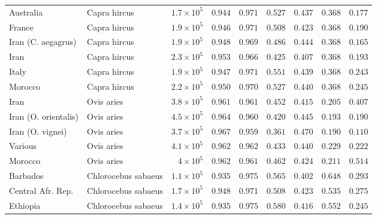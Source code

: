 \documentclass{article}
\begin{document}
\begin{table}[tb]
\begin{adjustbox}{width=\textwidth}
\begin{tabular}{||l|l|r||r|r||r|r||r|r||}
                \rowcolor{LIGHTGREY} Australia & Capra hircus & $1.7\times 10^{5}$ & $ 0.944$ & $ 0.971$ & $ 0.527$ & $ 0.437$ & $ 0.368$ & $ 0.177$ \\
                \rowcolor{LIGHTGREY} France & Capra hircus & $1.9\times 10^{5}$ & $ 0.946$ & $ 0.971$ & $ 0.508$ & $ 0.423$ & $ 0.368$ & $ 0.190$ \\
                \rowcolor{LIGHTGREY} Iran (C. aegagrus) & Capra hircus & $1.9\times 10^{5}$ & $ 0.948$ & $ 0.969$ & $ 0.486$ & $ 0.444$ & $ 0.368$ & $ 0.165$ \\
                \rowcolor{LIGHTGREY} Iran & Capra hircus & $2.3\times 10^{5}$ & $ 0.953$ & $ 0.966$ & $ 0.425$ & $ 0.407$ & $ 0.368$ & $ 0.193$ \\
                \rowcolor{LIGHTGREY} Italy & Capra hircus & $1.9\times 10^{5}$ & $ 0.947$ & $ 0.971$ & $ 0.551$ & $ 0.439$ & $ 0.368$ & $ 0.243$ \\
                \rowcolor{LIGHTGREY} Morocco & Capra hircus & $2.2\times 10^{5}$ & $ 0.950$ & $ 0.970$ & $ 0.527$ & $ 0.440$ & $ 0.368$ & $ 0.245$ \\
                Iran & Ovis aries & $3.8\times 10^{5}$ & $ 0.961$ & $ 0.961$ & $ 0.452$ & $ 0.415$ & $ 0.205$ & $ 0.407$ \\
                Iran (O. orientalis) & Ovis aries & $4.5\times 10^{5}$ & $ 0.964$ & $ 0.960$ & $ 0.420$ & $ 0.445$ & $ 0.193$ & $ 0.190$ \\
                Iran (O. vignei) & Ovis aries & $3.7\times 10^{5}$ & $ 0.967$ & $ 0.959$ & $ 0.361$ & $ 0.470$ & $ 0.190$ & $ 0.110$ \\
                Various & Ovis aries & $4.1\times 10^{5}$ & $ 0.962$ & $ 0.962$ & $ 0.433$ & $ 0.440$ & $ 0.229$ & $ 0.222$ \\
                Morocco & Ovis aries & $ 4\times 10^{5}$ & $ 0.962$ & $ 0.961$ & $ 0.462$ & $ 0.424$ & $ 0.211$ & $ 0.514$ \\
                \rowcolor{LIGHTGREY} Barbados & Chlorocebus sabaeus & $1.1\times 10^{5}$ & $ 0.935$ & $ 0.975$ & $ 0.565$ & $ 0.402$ & $ 0.648$ & $ 0.293$ \\
                \rowcolor{LIGHTGREY} Central Afr. Rep. & Chlorocebus sabaeus & $1.7\times 10^{5}$ & $ 0.948$ & $ 0.971$ & $ 0.508$ & $ 0.423$ & $ 0.535$ & $ 0.275$ \\
                \rowcolor{LIGHTGREY} Ethiopia & Chlorocebus sabaeus & $1.4\times 10^{5}$ & $ 0.935$ & $ 0.975$ & $ 0.580$ & $ 0.416$ & $ 0.552$ & $ 0.245$ \\

\end{tabular}
\end{adjustbox}
\end{table}
\end{document}
